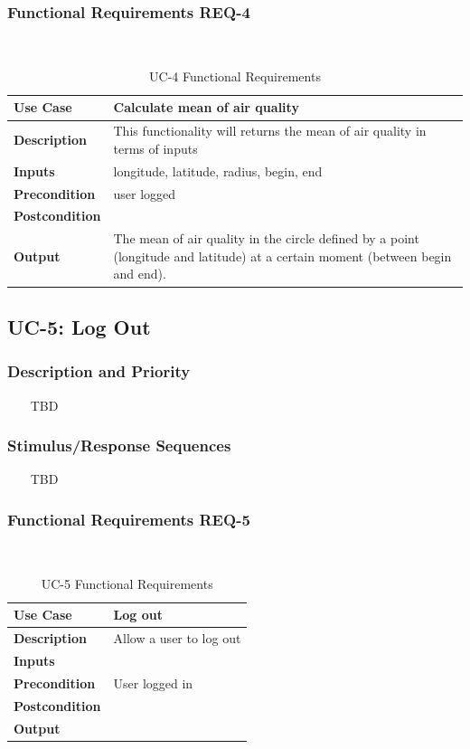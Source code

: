 \documentclass{report}
\begin{document}
\subsubsection*{Functional Requirements REQ-4} ~~~
\begin{table}[H]
	\begin{center}
		\begin{tabular}{|m{4cm}|m{10cm}|}
		\hline
		\textbf{Use Case} & Calculate mean of air quality \\
		\hline
		\textbf{Description} & This functionality will returns the mean of air quality in terms of inputs \\
		\hline
		\textbf{Inputs} & longitude, latitude, radius, begin, end \\
		\hline
		\textbf{Precondition} &  user logged\\
		\hline
		\textbf{Postcondition} &  \\
		\hline
		\textbf{Output} & The mean of air quality in the circle defined by a point (longitude and latitude) at a certain moment (between begin and end).\\
		\hline
		\end{tabular}
	\end{center}
	\caption{UC-4 Functional Requirements}
	\label{table:REQ-4}
\end{table}

\subsection{UC-5: Log Out}

\subsubsection*{Description and Priority} ~~~
TBD

\subsubsection*{Stimulus/Response Sequences} ~~~
TBD

\subsubsection*{Functional Requirements REQ-5} ~~~
\begin{table}[H]
	\begin{center}
		\begin{tabular}{|m{4cm}|m{10cm}|}
		\hline
		\textbf{Use Case} & Log out \\
		\hline
		\textbf{Description} & Allow a user to log out  \\
		\hline
		\textbf{Inputs} &  \\
		\hline
		\textbf{Precondition} & User logged in  \\
		\hline
		\textbf{Postcondition} &  \\
		\hline
		\textbf{Output} &  \\
		\hline
		\end{tabular}
	\end{center}
	\caption{UC-5 Functional Requirements}
	\label{table:REQ-5}
\end{table}
\end{document}
